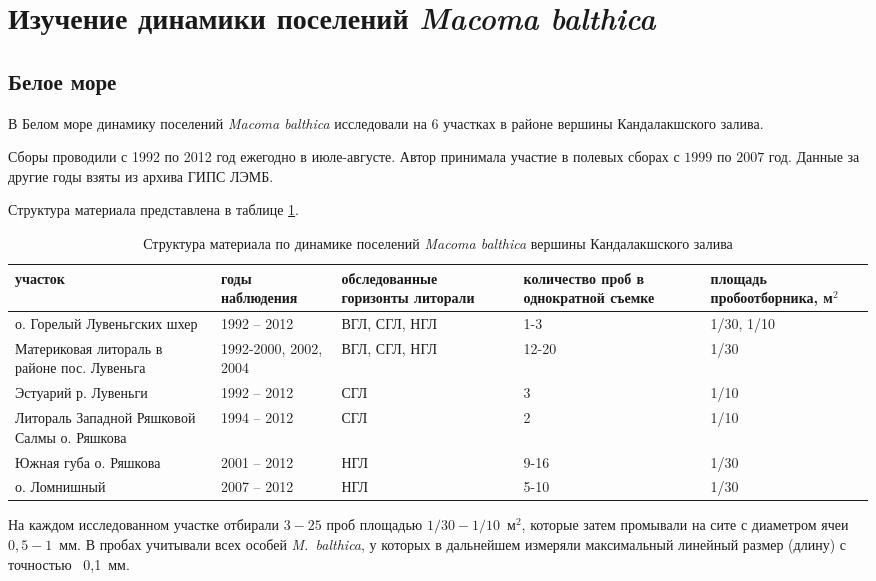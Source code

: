 \afterpage{\clearpage}

	\section{Изучение динамики поселений {\it Macoma balthica}}
        \subsection{Белое море}
В Белом море динамику поселений {\it Macoma balthica} исследовали на $6$ участках в районе вершины Кандалакшского залива. 

Сборы проводили с 1992 по 2012 год ежегодно в июле-августе.
Автор принимала участие в полевых сборах с $1999$ по $2007$ год.
Данные за другие годы взяты из архива ГИПС ЛЭМБ.

Структура материала представлена в таблице \ref{tab:material_Kandalaksha}.
\begin{table}[p]
\caption{Структура материала по динамике поселений {\it Macoma balthica} вершины Кандалакшского залива}
\label{tab:material_Kandalaksha}
    \begin{tabularx}{\textwidth}{|*{5}{X|}} \hline
участок & годы наблюдения & обследованные горизонты литорали & количество проб в однократной съемке & площадь пробоотборника, м$^2$  \\ \hline
о. Горелый Лувеньгских шхер & 1992 -- 2012 & ВГЛ, СГЛ, НГЛ & 1-3 & 1/30, 1/10 \\ \hline
Материковая литораль в районе пос. Лувеньга & 1992-2000, 2002, 2004 & ВГЛ, СГЛ, НГЛ & 12-20 & 1/30 \\ \hline
Эстуарий р. Лувеньги & 1992 -- 2012 & СГЛ & 3 & 1/10 \\ \hline
Литораль Западной Ряшковой Салмы о. Ряшкова & 1994 -- 2012 & СГЛ & 2 & 1/10 \\ \hline
Южная губа о. Ряшкова & 2001 -- 2012 & НГЛ & 9-16 & 1/30 \\ \hline
о. Ломнишный & 2007 -- 2012 & НГЛ & 5-10 & 1/30  \\ \hline
\end{tabularx}
\end{table}

На каждом исследованном участке отбирали $3 - 25$ проб площадью $1/30 - 1/10$~м$^2$, которые затем промывали на сите с диаметром ячеи $0,5 - 1$~мм. 
В пробах учитывали всех особей {\it M.~balthica}, у которых в дальнейшем измеряли максимальный линейный размер (длину) с точностью ~0,1~мм. 

